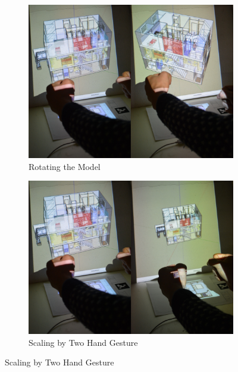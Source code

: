 \begin{figure}[!ht]
	\centering
        \begin{subfigure}[b]{0.32\textwidth}
	        \centering
                \includegraphics[width=\textwidth]{4-Interaction_Design/3d_rotate}
                \caption{Rotating the Model}
                \label{fig:rotate}
        \end{subfigure}%
        \hfill
        \begin{subfigure}[b]{0.32\textwidth}
            \centering
            \includegraphics[width=\textwidth]{4-Interaction_Design/3d_scale_two_hand}
                \caption{Scaling by Two Hand Gesture}
                \label{fig:scale_two_hand}
        \end{subfigure}

\end{figure}
